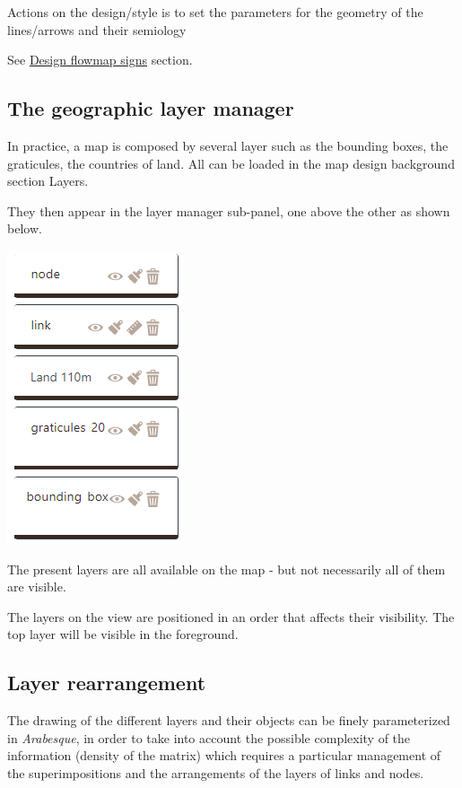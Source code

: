 \documentclass[
  letterpaper,
  DIV=11,
  numbers=noendperiod]{scrreprt}
\begin{document}
Actions on the design/style is to set the parameters for the geometry of
the lines/arrows and their semiology

See \href{./Design-flowmap-signs.html}{Design flowmap signs} section.

\subsection{The geographic layer
manager}\label{the-geographic-layer-manager}

In practice, a map is composed by several layer such as the bounding
boxes, the graticules, the countries of land. All can be loaded in the
map design background section Layers.

They then appear in the layer manager sub-panel, one above the other as
shown below.

\includegraphics{images/Types_layers.png}

The present layers are all available on the map - but not necessarily
all of them are visible.

The layers on the view are positioned in an order that affects their
visibility. The top layer will be visible in the foreground.

\subsection{Layer rearrangement}\label{layer-rearrangement}

The drawing of the different layers and their objects can be finely
parameterized in \emph{Arabesque}, in order to take into account the
possible complexity of the information (density of the matrix) which
requires a particular management of the superimpositions and the
arrangements of the layers of links and nodes.
\end{document}
